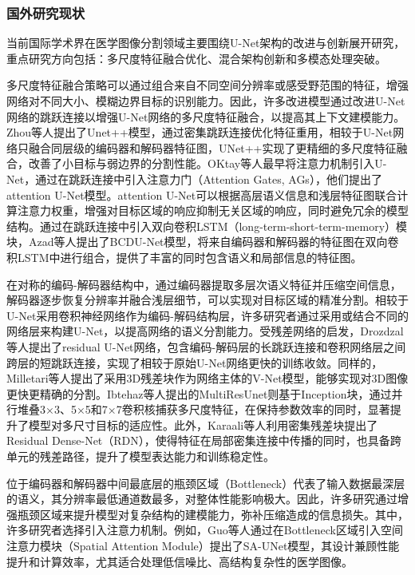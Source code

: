 \subsubsection{国外研究现状}

当前国际学术界在医学图像分割领域主要围绕U-Net架构的改进与创新展开研究，重点研究方向包括：多尺度特征融合优化、混合架构创新和多模态处理突破。

多尺度特征融合策略可以通过组合来自不同空间分辨率或感受野范围的特征，增强网络对不同大小、模糊边界目标的识别能力。因此，许多改进模型通过改进U-Net网络的跳跃连接以增强U-Net网络的多尺度特征融合，以提高其上下文建模能力。Zhou等人\cite{zhou2018}提出了Unet++模型，通过密集跳跃连接优化特征重用，相较于U-Net网络只融合同层级的编码器和解码器特征图，UNet++实现了更精细的多尺度特征融合，改善了小目标与弱边界的分割性能。OKtay等人\cite{oktay2018}最早将注意力机制引入U-Net，通过在跳跃连接中引入注意力门（Attention Gates, AGs），他们提出了attention U-Net模型。attention U-Net可以根据高层语义信息和浅层特征图联合计算注意力权重，增强对目标区域的响应抑制无关区域的响应，同时避免冗余的模型结构。通过在跳跃连接中引入双向卷积LSTM（long-term-short-term-memory）模块，Azad等人\cite{azad2019}提出了BCDU-Net模型，将来自编码器和解码器的特征图在双向卷积LSTM中进行组合，提供了丰富的同时包含语义和局部信息的特征图。

在对称的编码-解码器结构中，通过编码器提取多层次语义特征并压缩空间信息，解码器逐步恢复分辨率并融合浅层细节，可以实现对目标区域的精准分割。相较于U-Net采用卷积神经网络作为编码-解码结构层，许多研究者通过采用或结合不同的网络层来构建U-Net，以提高网络的语义分割能力。受残差网络的启发，Drozdzal等人\cite{drozdzal2016}提出了residual U-Net网络，包含编码-解码层的长跳跃连接和卷积网络层之间跨层的短跳跃连接，实现了相较于原始U-Net网络更快的训练收敛。同样的，Milletari等人\cite{milletari2016}提出了采用3D残差块作为网络主体的V-Net模型，能够实现对3D图像更快更精确的分割。Ibtehaz等人\cite{ibtehaz2020}提出的MultiResUnet则基于Inception块，通过并行堆叠3×3、5×5和7×7卷积核捕获多尺度特征，在保持参数效率的同时，显著提升了模型对多尺寸目标的适应性。此外，Karaali等人\cite{karaali2022}利用密集残差块提出了Residual Dense-Net（RDN），使得特征在局部密集连接中传播的同时，也具备跨单元的残差路径，提升了模型表达能力和训练稳定性。

位于编码器和解码器中间最底层的瓶颈区域（Bottleneck）代表了输入数据最深层的语义，其分辨率最低通道数最多，对整体性能影响极大。因此，许多研究通过增强瓶颈区域来提升模型对复杂结构的建模能力，弥补压缩造成的信息损失。其中，许多研究者选择引入注意力机制。例如，Guo等人\cite{guo2021}通过在Bottleneck区域引入空间注意力模块（Spatial Attention Module）提出了SA-UNet模型，其设计兼顾性能提升和计算效率，尤其适合处理低信噪比、高结构复杂性的医学图像。

